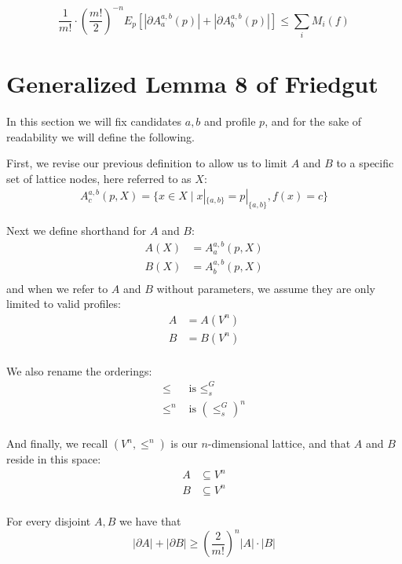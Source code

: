 	\begin{corollary}
		\[
			\frac{1}{m!} \cdot \left(\frac{m!}{2}\right)^{-n} E_p[|\partial A^{a,b}_a(p)| + |\partial A^{a,b}_b(p)|] \le \sum_i M_i(f)
		\]
	\end{corollary}


\section{Generalized Lemma 8 of Friedgut}

	In this section we will fix candidates $a, b$ and profile $p$, and for the sake of readability we will define the following.

	First, we revise our previous definition to allow us to limit $A$ and $B$ to a specific set of lattice nodes, here referred to as $X$:
	\begin{align*}
		A^{a,b}_c(p, X) = \{x \in X \mid x|_{\{a,b\}} = p|_{\{a,b\}}, f(x) = c\}
	\end{align*}

	Next we define shorthand for $A$ and $B$:
	\begin{align*}
		A(X) &= A^{a,b}_a(p, X) \\
		B(X) &= A^{a,b}_b(p, X) \\
	\end{align*}
	and when we refer to $A$ and $B$ without parameters, we assume they are only limited to valid profiles:
	\begin{align*}
		A &= A(V^n) \\
		B &= B(V^n) \\
	\end{align*}

	We also rename the orderings:
	\begin{align*}
		\le &\textrm{ is } \le_s^G \\
		\le^n &\textrm{ is } (\le_s^G)^n \\
	\end{align*}

	And finally, we recall $(V^n, \le^n)$ is our $n$-dimensional lattice, and that $A$ and $B$ reside in this space:
	\begin{align*}
		A &\subseteq V^n \\
		B &\subseteq V^n \\
	\end{align*}

	\begin{lemma}
		For every disjoint $A, B$ we have that
		\[
			|\partial A| + |\partial B| \ge \left( \frac{2}{m!} \right)^n |A| \cdot |B|
		\]
	\end{lemma}

